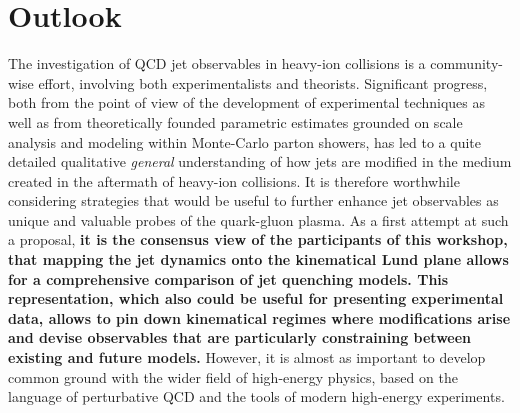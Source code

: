 
\section{Outlook}
\label{sec:outlook}

The investigation of QCD jet observables in heavy-ion collisions is a community-wise effort, involving both experimentalists and theorists. 
Significant progress, both from the point of view of the development of experimental techniques as well as from theoretically founded parametric estimates grounded on scale analysis and modeling within Monte-Carlo parton showers, has led to a quite detailed qualitative \textsl{general} understanding of how jets are modified in the medium created in the aftermath of heavy-ion collisions.
It is therefore worthwhile considering 
strategies that would be useful to further enhance jet observables as unique and valuable probes of the quark-gluon plasma.
As a first attempt at such a proposal, 
\textbf{it is the consensus view of the participants of this workshop, that mapping the jet dynamics onto the kinematical Lund plane allows for a comprehensive comparison of jet quenching models.
This representation, which also could be useful for presenting experimental data, allows to pin down kinematical regimes where modifications arise and devise observables that are particularly constraining between existing and future models.}
However, it is almost as important to develop common ground with the wider field of high-energy physics, based on the language of perturbative QCD and the tools of modern high-energy experiments.


